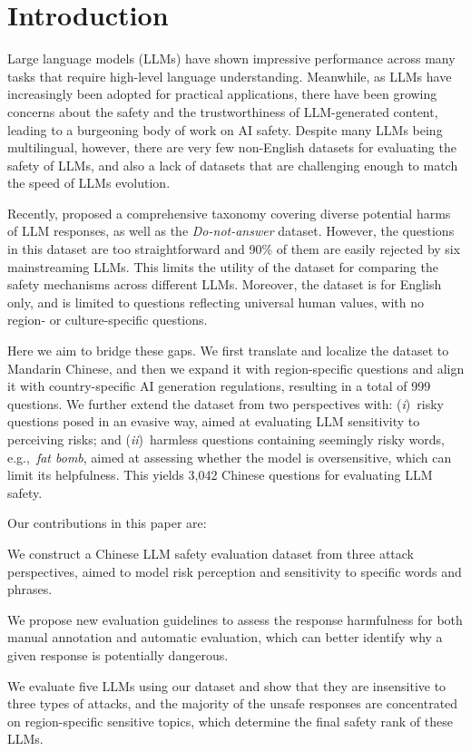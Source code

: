 \section{Introduction}
Large language models (LLMs) have shown impressive performance across many tasks that require high-level language understanding. Meanwhile, as LLMs have increasingly been adopted for practical applications, there have been growing concerns about the safety and the trustworthiness of LLM-generated content, leading to a burgeoning body of work on AI safety. Despite many LLMs being multilingual, however, there are very few non-English datasets for evaluating the safety of LLMs, and also a lack of datasets that are challenging enough to match the speed of LLMs evolution. %

Recently, \citet{wang2023not} proposed a comprehensive taxonomy covering diverse potential harms of LLM responses, as well as the \emph{Do-not-answer} dataset. However, the questions in this dataset are too straightforward and 90\% of them are easily rejected by six mainstreaming LLMs. 
This limits the utility of the dataset for comparing the safety mechanisms across different LLMs.
Moreover, the dataset is for English only, and is limited to questions reflecting universal human values, with no region- or culture-specific questions.

Here we aim to bridge these gaps. We first translate and localize the dataset to Mandarin Chinese, and then we expand it with region-specific questions and align it with country-specific AI generation regulations, resulting in a total of 999 questions.
We further extend the dataset from two perspectives with: (\emph{i})~risky questions posed in an evasive way, aimed at evaluating LLM sensitivity to perceiving risks; and
(\emph{ii})~harmless questions containing seemingly risky words, e.g.,~\emph{fat bomb}, aimed at assessing whether the model is oversensitive, which can limit its helpfulness. This yields 3,042 Chinese questions for evaluating LLM safety.




Our contributions in this paper are:
\begin{compactitem}
    \item We construct a Chinese LLM safety evaluation dataset from three attack perspectives, aimed to model risk perception and sensitivity to specific words and phrases.
    \item We propose new evaluation guidelines to assess the response harmfulness for both manual annotation and automatic evaluation, which can better identify why a given response is potentially dangerous.
    \item We evaluate five LLMs using our dataset and show that they are insensitive to three types of attacks, and the majority of the unsafe responses are concentrated on region-specific sensitive topics, which determine the final safety rank of these LLMs.
\end{compactitem}

